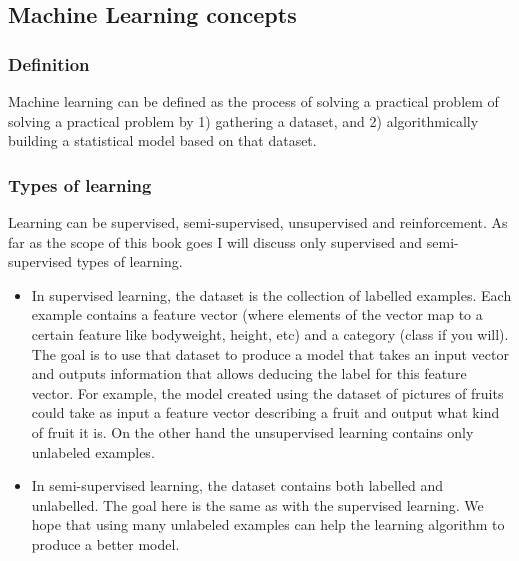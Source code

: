 \documentclass[pdftex,english,oribibl]{llncs}
\begin{document}
\subsection{Machine Learning concepts \\}
\subsubsection{Definition \\}
Machine learning can be defined as the process of solving a practical problem of solving a practical problem by 1) gathering a dataset, and 2) algorithmically building a statistical model based on that dataset.
\subsubsection{Types of learning \\}
Learning can be supervised, semi-supervised, unsupervised and reinforcement. As far as the scope of this book goes I will discuss only supervised and semi-supervised types of learning.
\begin{itemize}
\item In supervised learning, the dataset is the collection of labelled examples. Each example contains a feature vector (where elements of the vector map to a certain feature like bodyweight, height, etc) and a category (class if you will). The goal is to use that dataset to produce a model that takes an input vector and outputs information that allows deducing the label for this feature vector. For example, the model created using the dataset of pictures of fruits could take as input a feature vector describing a fruit and output what kind of fruit it is. On the other hand the unsupervised learning contains only unlabeled examples.
\item In semi-supervised learning, the dataset contains both labelled and unlabelled. The goal here is the same as with the supervised learning. We hope that using many unlabeled examples can help the learning algorithm to produce a better model. 
\end{itemize}
\end{document}
